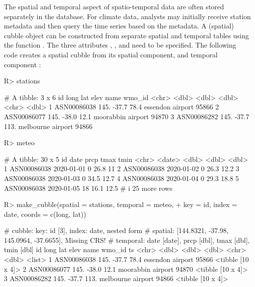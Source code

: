 \documentclass[
  shortnames]{jss}
\begin{document}
The spatial and temporal aspect of spatio-temporal data are often stored separately in the database. For climate data, analysts may initially receive station metadata and then query the time series based on the metadata. A (spatial) cubble object can be constructed from separate spatial and temporal tables using the function . The three attributes , , and  need to be specified. The following code creates a spatial cubble from its spatial component,  and temporal component :

\begin{CodeChunk}
\begin{CodeInput}
R> stations
\end{CodeInput}
\begin{CodeOutput}
# A tibble: 3 x 6
  id           long   lat  elev name              wmo_id
  <chr>       <dbl> <dbl> <dbl> <chr>              <dbl>
1 ASN00086038  145. -37.7  78.4 essendon airport   95866
2 ASN00086077  145. -38.0  12.1 moorabbin airport  94870
3 ASN00086282  145. -37.7 113.  melbourne airport  94866
\end{CodeOutput}
\begin{CodeInput}
R> meteo
\end{CodeInput}
\begin{CodeOutput}
# A tibble: 30 x 5
  id          date        prcp  tmax  tmin
  <chr>       <date>     <dbl> <dbl> <dbl>
1 ASN00086038 2020-01-01     0  26.8  11  
2 ASN00086038 2020-01-02     0  26.3  12.2
3 ASN00086038 2020-01-03     0  34.5  12.7
4 ASN00086038 2020-01-04     0  29.3  18.8
5 ASN00086038 2020-01-05    18  16.1  12.5
# i 25 more rows
\end{CodeOutput}
\begin{CodeInput}
R> make_cubble(spatial = stations, temporal = meteo,
+             key = id, index = date, coords = c(long, lat))
\end{CodeInput}
\begin{CodeOutput}
# cubble:   key: id [3], index: date, nested form
# spatial:  [144.8321, -37.98, 145.0964, -37.6655], Missing CRS!
# temporal: date [date], prcp [dbl], tmax [dbl], tmin [dbl]
  id           long   lat  elev name              wmo_id ts               
  <chr>       <dbl> <dbl> <dbl> <chr>              <dbl> <list>           
1 ASN00086038  145. -37.7  78.4 essendon airport   95866 <tibble [10 x 4]>
2 ASN00086077  145. -38.0  12.1 moorabbin airport  94870 <tibble [10 x 4]>
3 ASN00086282  145. -37.7 113.  melbourne airport  94866 <tibble [10 x 4]>
\end{CodeOutput}
\end{CodeChunk}
\end{document}
